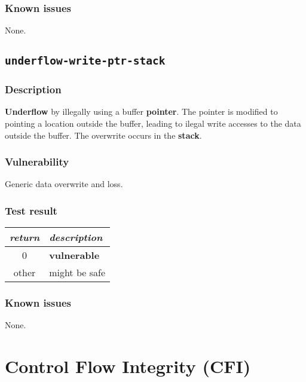 \documentclass[a4paper]{book}
\begin{document}
\subsubsection{Known issues}

None.

\newpage

\subsection{\texttt{underflow-write-ptr-stack}}\label{test-underflow-write-ptr-stack}

\subsubsection{Description}

\textbf{Underflow} by illegally using a buffer \textbf{pointer}.
The pointer is modified to pointing a location outside the buffer,
leading to ilegal write accesses to the data outside the buffer.
The overwrite occurs in the \textbf{stack}.

\subsubsection{Vulnerability}
Generic data overwrite and loss.

\subsubsection{Test result}

\begin{tabular}{cl}
  \toprule
  \emph{return}  & \emph{description} \\
  \midrule
  0              & \textbf{vulnerable} \\
  other          & might be safe \\
  \bottomrule
\end{tabular}

\subsubsection{Known issues}

None.

\newpage

\section{Control Flow Integrity (CFI)}
\end{document}
